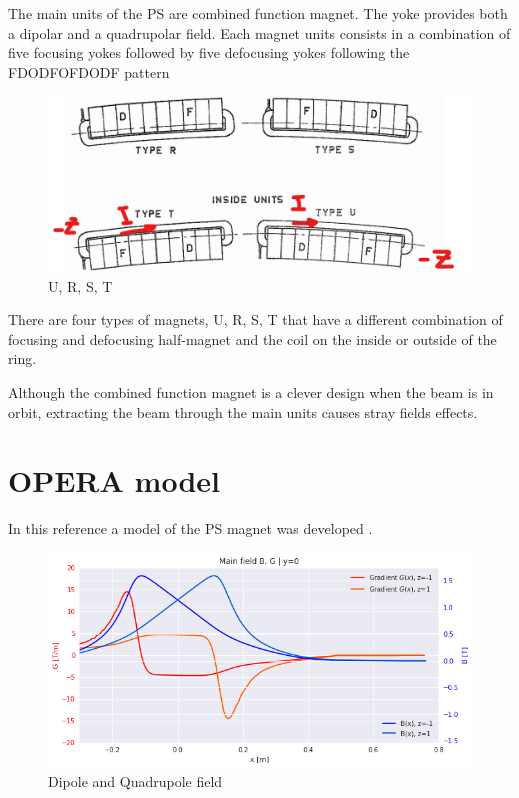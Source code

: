 \documentclass[a4paper,
               biblatex,     %
               keeplastbox,   %
               ]{jacow}
\begin{document}
The main units of the PS are combined function magnet. The yoke provides both a dipolar and a quadrupolar field. Each magnet units consists in a combination of five focusing yokes followed by five defocusing yokes following the FDODFOFDODF pattern \cite{}

\begin{figure}[!htb]
   \centering
   \includegraphics*[width=1.0\columnwidth]{magnet_type.png}
   \caption{U, R, S, T}
   \label{fig:magnet_type}
\end{figure}

There are four types of magnets, U, R, S, T that have a different combination of focusing and defocusing half-magnet and the coil on the inside or outside of the ring.

Although the combined function magnet is a clever design when the beam is in orbit, extracting the beam through the main units causes stray fields effects.

\section{OPERA model}

In this reference a model of the PS magnet was developed \cite{anglada_reference_nodate}.

\begin{figure}[!htb]
   \centering
   \includegraphics*[width=1.0\columnwidth]{main_field.png}
   \caption{Dipole and Quadrupole field}
   \label{fig:main_field}
\end{figure}
\end{document}
